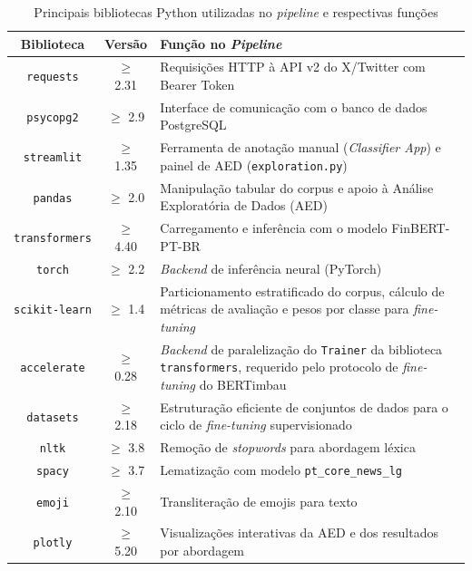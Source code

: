 \begin{table}[!htb]
	\caption[Principais bibliotecas Python utilizadas no \textit{pipeline} e respectivas funções]{Principais bibliotecas Python utilizadas no \textit{pipeline} e respectivas funções}
	\label{tab:bibliotecas}
	\centering
	\begin{tabular}{ccp{10cm}}
		\hline
		\textbf{Biblioteca} & \textbf{Versão} & \textbf{Função no \textit{Pipeline}} \\
		
		\hline
		\texttt{requests} & $\geq$ 2.31 & Requisições HTTP à API v2 do X/Twitter com Bearer Token \\
		
		\hline
		\texttt{psycopg2} & $\geq$ 2.9 & Interface de comunicação com o banco de dados PostgreSQL \\
		
		\hline
		\texttt{streamlit} & $\geq$ 1.35 & Ferramenta de anotação manual (\textit{Classifier App}) e painel de AED (\texttt{exploration.py}) \\
		
		\hline
		\texttt{pandas} & $\geq$ 2.0 & Manipulação tabular do corpus e apoio à Análise Exploratória de Dados (AED) \\
		
		\hline
		\texttt{transformers} & $\geq$ 4.40 & Carregamento e inferência com o modelo FinBERT-PT-BR \\
		
		\hline
		\texttt{torch} & $\geq$ 2.2 & \textit{Backend} de inferência neural (PyTorch) \\
		
		\hline
		\texttt{scikit-learn} & $\geq$ 1.4 & Particionamento estratificado do corpus, cálculo de métricas de avaliação e pesos por classe para \textit{fine-tuning} \\
		
		\hline
		\texttt{accelerate} & $\geq$ 0.28 & \textit{Backend} de paralelização do \texttt{Trainer} da biblioteca \texttt{transformers}, requerido pelo protocolo de \textit{fine-tuning} do BERTimbau \\
		
		\hline
		\texttt{datasets} & $\geq$ 2.18 & Estruturação eficiente de conjuntos de dados para o ciclo de \textit{fine-tuning} supervisionado \\
		
		\hline
		\texttt{nltk} & $\geq$ 3.8 & Remoção de \textit{stopwords} para abordagem léxica \\
		
		\hline
		\texttt{spacy} & $\geq$ 3.7 & Lematização com modelo \texttt{pt\_core\_news\_lg} \\
		
		\hline
		\texttt{emoji} & $\geq$ 2.10 & Transliteração de emojis para texto \\
		
		\hline
		\texttt{plotly} & $\geq$ 5.20 & Visualizações interativas da AED e dos resultados por abordagem \\
		\hline
	\end{tabular}
\end{table}

